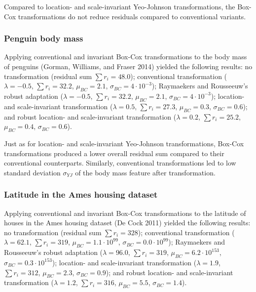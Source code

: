 \documentclass[preprint,12pt,authoryear]{elsarticle}
\begin{document}
Compared to location- and scale-invariant Yeo-Johnson transformations,
the Box-Cox transformations do not reduce residuals compared to
conventional variants.

\subsubsection{Penguin body mass}\label{penguin-body-mass}

Applying conventional and invariant Box-Cox transformations to the body
mass of penguins (Gorman, Williams, and Fraser 2014) yielded the
following results: no transformation (residual sum \(\sum r_i = 48.0\));
conventional transformation (\(\lambda = -0.5\), \(\sum r_i = 32.2\),
\(\mu_{BC} = 2.1\), \(\sigma_{BC} = 4 \cdot 10^{-3}\)); Raymaekers and
Rousseeuw's robust adaptation (\(\lambda = -0.5\), \(\sum r_i = 32.2\),
\(\mu_{BC} = 2.1\), \(\sigma_{BC} = 4 \cdot 10^{-3}\)); location- and
scale-invariant transformation (\(\lambda = 0.5\), \(\sum r_i = 27.3\),
\(\mu_{BC} = 0.3\), \(\sigma_{BC} = 0.6\)); and robust location- and
scale-invariant transformation (\(\lambda = 0.2\), \(\sum r_i = 25.2\),
\(\mu_{BC} = 0.4\), \(\sigma_{BC} = 0.6\)).

Just as for location- and scale-invariant Yeo-Johnson transformations,
Box-Cox transformations produced a lower overall residual sum compared
to their conventional counterparts. Similarly, conventional
transformations led to low standard deviation \(\sigma_{YJ}\) of the
body mass feature after transformation.

\subsubsection{Latitude in the Ames housing
dataset}\label{latitude-in-the-ames-housing-dataset}

Applying conventional and invariant Box-Cox transformations to the
latitude of houses in the Ames housing dataset (De Cock 2011) yielded
the following results: no transformation (residual sum
\(\sum r_i = 328\)); conventional transformation (\(\lambda = 62.1\),
\(\sum r_i = 319\), \(\mu_{BC} = 1.1 \cdot 10^{99}\),
\(\sigma_{BC} = 0.0 \cdot 10^{99}\)); Raymaekers and Rousseeuw's robust
adaptation (\(\lambda = 96.0\), \(\sum r_i = 319\),
\(\mu_{BC} = 6.2 \cdot 10^{153}\),
\(\sigma_{BC} = 0.3 \cdot 10^{153}\)); location- and scale-invariant
transformation (\(\lambda = 1.9\), \(\sum r_i = 312\),
\(\mu_{BC} = 2.3\), \(\sigma_{BC} = 0.9\)); and robust location- and
scale-invariant transformation (\(\lambda = 1.2\), \(\sum r_i = 316\),
\(\mu_{BC} = 5.5\), \(\sigma_{BC} = 1.4\)).
\end{document}
